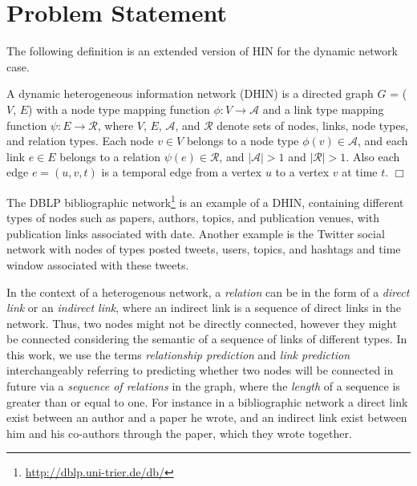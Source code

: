 \section{Problem Statement}

The following definition is an extended version of HIN \cite{sun2011pathsim} for the dynamic network case.

\begin{definition}
A dynamic heterogeneous information network (DHIN) is a directed graph $G$ = ($V$, $E$) with a node type mapping function $\phi: V \rightarrow \mathcal{A}$ and a link type mapping function $\psi: E \rightarrow \mathcal{R}$, where $V$, $E$, $\mathcal{A}$, and $\mathcal{R}$ denote sets of nodes, links, node types, and relation types. Each node $v \in V$ belongs to a node type $\phi(v) \in \mathcal{A}$, and each link $e \in E$ belongs to a relation $\psi(e) \in \mathcal{R}$, and $|\mathcal{A}| > 1$ and $|\mathcal{R}| > 1$.  Also each edge $e = (u, v, t)$ is a temporal edge from a vertex $u$ to a vertex $v$ at time $t$. 
$\Box$ 

\end{definition}

The DBLP bibliographic network\footnote{\url{http://dblp.uni-trier.de/db/}} is an example of a DHIN, containing different types of nodes such as papers, authors, topics, and publication venues, with publication links associated with date. Another example is the Twitter social network with nodes of types posted tweets, users, topics, and hashtags and time window associated with these tweets. %

In the context of a heterogenous network, a \textit{relation} can be in the form of a \textit{direct link} or an \textit{indirect link}, where an indirect link is a sequence of direct links in the network. Thus, two nodes might not be directly connected, however they might be connected considering the semantic of a sequence of links of different types. In this work, we use the terms \textit{relationship prediction} and \textit{link prediction} interchangeably referring to predicting whether two nodes will be connected in future via a \textit{sequence of relations} in the graph, where the \textit{length} of a sequence is greater than or equal to one. For instance in a bibliographic network a direct link exist between an author and a paper he wrote, and an indirect link exist between him and his co-authors through the paper, which they wrote together.

